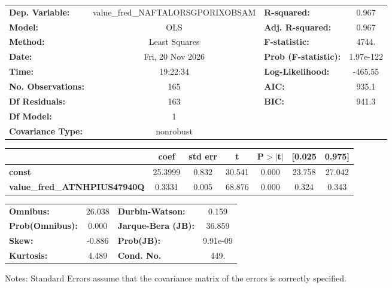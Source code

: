 \begin{center}
\begin{tabular}{lclc}
\toprule
\textbf{Dep. Variable:}              & value\_fred\_NAFTALORSGPORIXOBSAM & \textbf{  R-squared:         } &     0.967   \\
\textbf{Model:}                      &                OLS                & \textbf{  Adj. R-squared:    } &     0.967   \\
\textbf{Method:}                     &           Least Squares           & \textbf{  F-statistic:       } &     4744.   \\
\textbf{Date:}                       &          Fri, 20 Nov 2026         & \textbf{  Prob (F-statistic):} & 1.97e-122   \\
\textbf{Time:}                       &              19:22:34             & \textbf{  Log-Likelihood:    } &   -465.55   \\
\textbf{No. Observations:}           &                  165              & \textbf{  AIC:               } &     935.1   \\
\textbf{Df Residuals:}               &                  163              & \textbf{  BIC:               } &     941.3   \\
\textbf{Df Model:}                   &                    1              & \textbf{                     } &             \\
\textbf{Covariance Type:}            &             nonrobust             & \textbf{                     } &             \\
\bottomrule
\end{tabular}
\begin{tabular}{lcccccc}
                                     & \textbf{coef} & \textbf{std err} & \textbf{t} & \textbf{P$> |$t$|$} & \textbf{[0.025} & \textbf{0.975]}  \\
\midrule
\textbf{const}                       &      25.3999  &        0.832     &    30.541  &         0.000        &       23.758    &       27.042     \\
\textbf{value\_fred\_ATNHPIUS47940Q} &       0.3331  &        0.005     &    68.876  &         0.000        &        0.324    &        0.343     \\
\bottomrule
\end{tabular}
\begin{tabular}{lclc}
\textbf{Omnibus:}       & 26.038 & \textbf{  Durbin-Watson:     } &    0.159  \\
\textbf{Prob(Omnibus):} &  0.000 & \textbf{  Jarque-Bera (JB):  } &   36.859  \\
\textbf{Skew:}          & -0.886 & \textbf{  Prob(JB):          } & 9.91e-09  \\
\textbf{Kurtosis:}      &  4.489 & \textbf{  Cond. No.          } &     449.  \\
\bottomrule
\end{tabular}
\end{center}

Notes: \newline
 [1] Standard Errors assume that the covariance matrix of the errors is correctly specified.